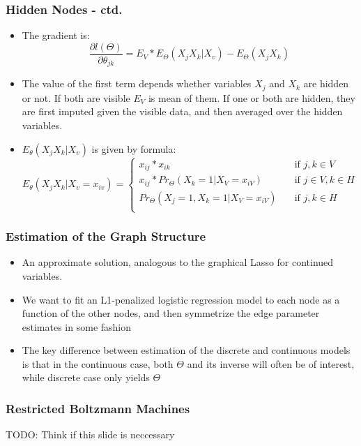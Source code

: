 \documentclass{beamer}
\begin{document}
\begin{frame}
\frametitle{ Hidden Nodes - ctd.}
\begin{itemize}
\item The gradient is:
\begin{equation}
\frac{\partial l(\Theta)}{\partial \theta_{jk}} = E_{V} * E_{\Theta}(X_jX_k|X_v) -  E_{\Theta}(X_jX_k)
\end{equation}
\item The value of the first term depends whether variables $X_j$ and $X_k$ are hidden or not. If both are visible $E_V$ is mean of them. If one or both are hidden, they are first imputed given the visible data, and then averaged over the hidden variables.
\item $E_{\theta}(X_jX_k | X_v)$ is given by formula:
\[E_{\theta}(X_jX_k | X_v = x_{iv}) = \begin{cases}
    x_{ij}*x_{ik}       & \quad \text{if } j, k \in V\\
     x_{ij}*Pr_{\Theta}(X_k = 1 | X_V = x_{iV})       & \quad \text{if } j \in V, k \in H\\
     Pr_{\Theta}(X_j = 1, X_k = 1 | X_V = x_{iV})       & \quad \text{if } j, k \in H\\
\end{cases} 
\]
\end{itemize}
\end{frame}

\begin{frame}
\frametitle{ Estimation of the Graph Structure }
\begin{itemize}
\item{An approximate solution, analogous to the graphical Lasso for continued variables.}
\item{We want to fit an L1-penalized logistic regression model to each node as a function of the other nodes, and then symmetrize the edge parameter estimates in some fashion}
\item{The key difference between estimation of the discrete and continuous models is that in the continuous case, both $\Theta$ and its inverse will often be of interest, while discrete case only yields $\Theta$}
\end{itemize}
\end{frame}

\begin{frame}
\frametitle{ Restricted Boltzmann Machines }
TODO: Think if this slide is neccessary
\end{frame}
\end{document}
